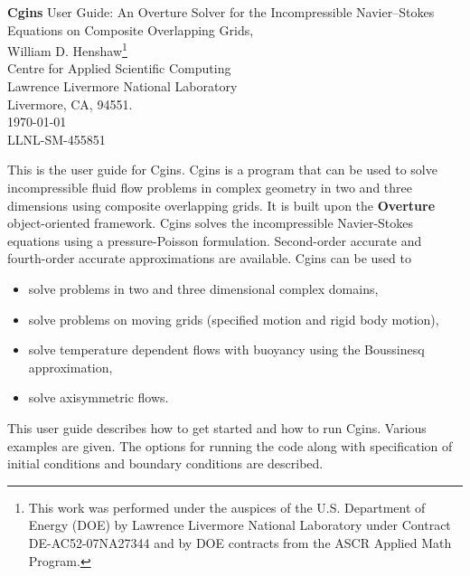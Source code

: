 \documentclass{article}
\newcommand{\Overture}{{\bf Overture\ }}
\begin{document}


\def\ud     {{    U}}
\def\pd     {{    P}}

\newcommand{\mbar}{\bar{m}}
\newcommand{\Rbar}{\bar{R}}
\newcommand{\Ru}{R_u}         %
\newcommand{\Div}{\grad\cdot}
\newcommand{\tauv}{\boldsymbol{\tau}}
\newcommand{\sumi}{\sum_{i=1}^n}
\newcommand{\dt}{{\Delta t}}

\baselineskip
\begin{flushleft}
{\Large
{\bf Cgins} User Guide: An Overture Solver for the Incompressible Navier--Stokes Equations on Composite Overlapping Grids, \\
}
\vspace{2\baselineskip}
William D. Henshaw\footnote{This work was performed under the auspices of the U.S. Department of Energy (DOE) by
Lawrence Livermore National Laboratory under Contract DE-AC52-07NA27344 and by 
DOE contracts from the ASCR Applied Math Program.}  \\
Centre for Applied Scientific Computing  \\
Lawrence Livermore National Laboratory      \\
Livermore, CA, 94551.  \\
\vspace{\baselineskip}
\today\\
\vspace{\baselineskip}
LLNL-SM-455851

\vspace{4\baselineskip}

This is the user guide for Cgins.  Cgins is a program that can be used to solve
incompressible fluid flow problems in complex geometry in two and three
dimensions using composite overlapping grids. It is built upon the \Overture
object-oriented framework.  Cgins solves the incompressible Navier-Stokes
equations using a pressure-Poisson formulation. Second-order accurate and
fourth-order accurate approximations are available.  Cgins can be used to
\begin{itemize}
  \item solve problems in two and three dimensional complex domains,
  \item solve problems on moving grids (specified motion and rigid body motion), 
  \item solve temperature dependent flows with buoyancy using the Boussinesq approximation,  
  \item solve axisymmetric flows.
\end{itemize} 
This user guide describes how to get started and how to run Cgins. Various examples are given.
The options for running the code along with specification of initial conditions and
boundary conditions are described.

\end{flushleft}
\end{document}
